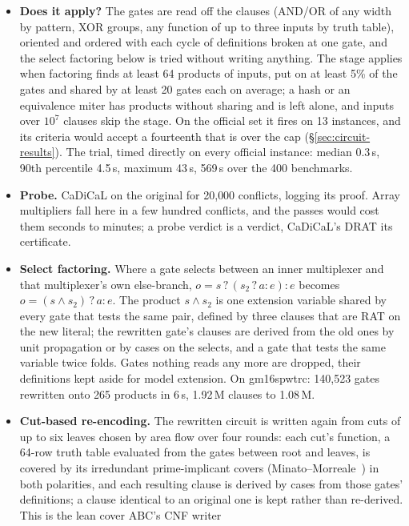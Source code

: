 \documentclass[10pt]{article}
\begin{document}
\begin{itemize}
\item \textbf{Does it apply?} The gates are read off the clauses
  (AND/OR of any width by pattern, XOR groups, any function of up to
  three inputs by truth table), oriented and ordered with each cycle of
  definitions broken at one gate, and the select factoring below is
  tried without writing anything. The stage applies when factoring finds
  at least 64 products of inputs, put on at least 5\% of the gates and
  shared by at least 20 gates each on average; a hash or an equivalence
  miter has products without sharing and is left alone, and inputs over
  $10^7$ clauses skip the stage. On the official set it fires on 13
  instances, and its criteria would accept a fourteenth that is over the
  cap (\S\ref{sec:circuit-results}). The trial, timed directly on
  every official instance: median 0.3\,s, 90th percentile 4.5\,s,
  maximum 43\,s, 569\,s over the 400 benchmarks.
\item \textbf{Probe.} CaDiCaL on the original for 20{,}000 conflicts,
  logging its proof. Array multipliers fall here in a few hundred
  conflicts, and the passes would cost them seconds to minutes; a probe
  verdict is a verdict, CaDiCaL's DRAT its certificate.
\item \textbf{Select factoring.} Where a gate selects between an inner
  multiplexer and that multiplexer's own else-branch,
  $o = s\,?\,(s_2\,?\,a : e) : e$ becomes $o = (s \wedge s_2)\,?\,a : e$.
  The product $s \wedge s_2$ is one extension variable shared by every
  gate that tests the same pair, defined by three clauses that are RAT
  on the new literal; the rewritten gate's clauses are derived from the
  old ones by unit propagation or by cases on the selects, and a gate
  that tests the same variable twice folds. Gates nothing reads any more
  are dropped, their definitions kept aside for model extension. On
  gm16spwtrc: 140{,}523 gates rewritten onto 265 products in 6\,s,
  1.92\,M clauses to 1.08\,M.
\item \textbf{Cut-based re-encoding.} The rewritten circuit is written
  again from cuts of up to six leaves chosen by area flow over four
  rounds: each cut's function, a 64-row truth table evaluated from the
  gates between root and leaves, is covered by its irredundant
  prime-implicant covers (Minato--Morreale~\cite{morreale70,minato93})
  in both polarities, and each resulting clause is derived by cases from
  those gates' definitions; a clause identical to an original one is
  kept rather than re-derived. This is the lean cover ABC's CNF writer

\end{itemize}
\end{document}
